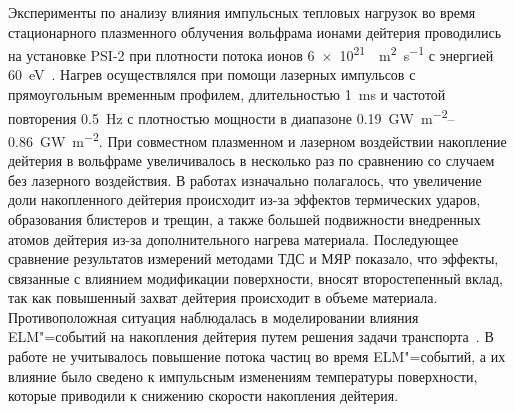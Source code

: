 Эксперименты по анализу влияния импульсных тепловых нагрузок во время стационарного плазменного облучения вольфрама ионами дейтерия проводились на установке PSI-2 при плотности потока ионов \SI{6e21}{\per\meter\squared\per\second} с энергией \SI{60}{\electronvolt}~\cite{Huber2016_1, Huber2016_2}. Нагрев осуществлялся при помощи лазерных импульсов с прямоугольным временным профилем, длительностью \SI{1}{\milli\second} и частотой повторения \SI{0.5}{\hertz} с плотностью мощности в диапазоне \SIrange{0.19}{0.86}{\giga\watt\per\meter\squared}. При совместном плазменном и лазерном воздействии накопление дейтерия в вольфраме увеличивалось в несколько раз по сравнению со случаем без лазерного воздействия. В работах изначально полагалось, что увеличение доли накопленного дейтерия происходит из-за эффектов термических ударов, образования блистеров и трещин, а также большей подвижности внедренных атомов дейтерия из-за дополнительного нагрева материала. Последующее сравнение результатов измерений методами ТДС и МЯР показало, что эффекты, связанные с влиянием модификации поверхности, вносят второстепенный вклад, так как повышенный захват дейтерия происходит в объеме материала. Противоположная ситуация наблюдалась в моделировании влияния ELM"=событий на накопления дейтерия путем решения задачи транспорта~\cite{Hu2015}. В работе не учитывалось повышение потока частиц во время ELM"=событий, а их влияние было сведено к импульсным изменениям температуры поверхности, которые приводили к снижению скорости накопления дейтерия.

